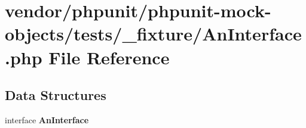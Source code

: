 \section{vendor/phpunit/phpunit-\/mock-\/objects/tests/\+\_\+fixture/\+An\+Interface.php File Reference}
\label{_an_interface_8php}
\subsection*{Data Structures}
\begin{DoxyCompactItemize}
\item 
interface {\bf An\+Interface}
\end{DoxyCompactItemize}
